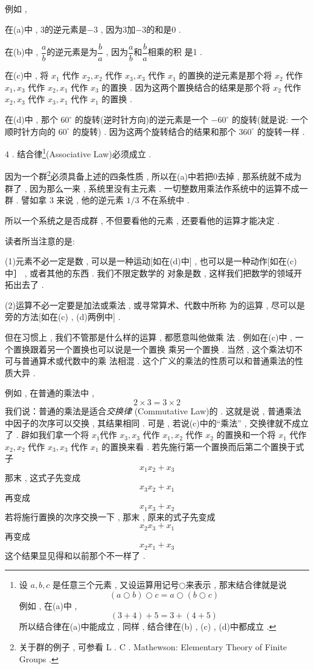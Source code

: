 例如 , 

在(a)中 , 3的逆元素是$-3$ , 因为3加$-3$的和是0 . 

在(b)中 , $\dfrac{a}{b}$的逆元素是为$\dfrac{b}{a}$ , 因为$\dfrac{a}{b}$和$\dfrac{b}{a}$相乘的积 是1 . 

在(c)中 , 将 $x_{1}$ 代作 $x_{2} ,  x_{2}$ 代作 $x_{3} ,  x_{3}$ 代作 $x_{1}$ 的置换的逆元素是那个将 $x_{2}$ 代作 $x_{1} ,  x_{3}$ 代作 $x_{2} ,  x_{1}$ 代作 $x_{3}$ 的置换 . 因为这两个置换结合的结果是那个将 $x_{2}$ 代作 $x_{2} ,  x_{3}$ 代作 $x_{3} ,  x_{1}$ 代作 $x_{1}$ 的置换 .  

在(d)中 , 那个 $60^{\circ}$ 的旋转(逆时针方向)的逆元素是一个 $-60^{\circ}$ 的旋转(就是说: 一个顺时针方向的 $60^{\circ}$ 的旋转) . 因为这两个旋转结合的结果和那个 $360^{\circ}$ 的旋转一样 . 

4 .  结合律\footnote{设 $a ,  b ,  c$ 是任意三个元素 ,  又设运算用记号$\bigcirc$来表示 , 那末结合律就是说
\[(a  \bigcirc  b) \bigcirc  c=a  \bigcirc (b  \bigcirc  c)\]
例如 , 在(a)中 , 
\[
(3+4)+5=3+(4+5)
\]
所以结合律在(a)中能成立 , 同样 , 结合律在(b) , (c) , (d)中都成立 . }(Associative Law)必须成立 . 

因为一个群\footnote{关于群的例子 , 可参看 L .  C .  Mathewson: Elementary Theory of Finite Groups . }必须具备上述的四条性质 ,  所以在(a)中若把0去掉 , 那系统就不成为群了 , 因为那么一来 , 系统里没有主元素 .  一切整数用乘法作系统中的运算不成一群 . 譬如拿 3 来说 , 他的逆元素 $1/3$ 不在系统中 . 

所以一个系统之是否成群 , 不但要看他的元素 , 还要看他的运算才能决定 . 

读者所当注意的是:

(1)元素不必一定是数 , 可以是一种运动[如在(d)中] , 也可以是一种动作[如在(c)中］ , 或者其他的东西 . 我们不限定数学的 对象是数 , 这样我们把数学的领域开拓出去了 . 

(2)运算不必一定要是加法或乘法 , 或寻常算术、代数中所称 为的运算 , 尽可以是旁的方法[如在(c) , (d)两例中] . 

但在习惯上 , 我们不管那是什么样的运算 , 都愿意叫他做乘 法 . 例如在(c)中 , 一个置换跟着另一个置换也可以说是一个置换 乘另一个置换 . 当然 , 这个乘法切不可与普通算术或代数中的乘 法相混 . 这个广义的乘法的性质可以和普通乘法的性质大异 . 

例如 , 在普通的乘法中 , 
\[
2 \times 3=3 \times 2
\]
我们说：普通的乘法是适合\emph{交换律} (Commutative Law)的 . 这就是说 , 普通乘法中因子的次序可以交换 , 其结果相同 . 可是 , 若说(c)中的“乘法” , 交换律就不成立了 . 辟如我们拿一个将 $x_{1}$代作 $x_{3} ,  x_{3}$ 代作 $x_{1} ,  x_{2}$ 代作 $x_{2}$ 的置换和一个将 $x_{1}$ 代作 $x_{2} ,  x_{2}$ 代作 $x_{3} ,  x_{3}$ 代作 $x_{1}$ 的置换来看 . 若先施行第一个置换而后第二个置换于式子
\[
x_{1} x_{2}+x_{3}
\]
那末 , 这式子先变成
\[
x_{3} x_{2}+x_{1}
\]
再变成
\[
x_{1} x_{3}+x_{2}
\]
若将施行置换的次序交换一下 , 那末 , 原来的式子先变成
\[
x_{2} x_{3}+x_{1}
\]
再变成
\[
x_{2} x_{1}+x_{3}
\]
这个结果显见得和以前那个不一样了 . 

